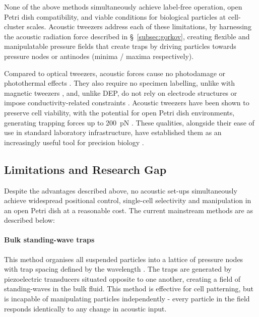 \documentclass[11pt,a4paper]{article}
\begin{document}
\noindent None of the above methods simultaneously achieve label-free operation, open Petri dish compatibility, and viable conditions for biological particles at cell-cluster scales. Acoustic tweezers address each of these limitations, by harnessing the acoustic radiation force described in \S~\ref{subsec:gorkov}, creating flexible and manipulatable pressure fields that create traps by driving particles towards pressure nodes or antinodes (minima / maxima respectively). 



Compared to optical tweezers, acoustic forces cause no photodamage or photothermal effects \cite{blazquez2019optical, neuman2008single, yang2025acoustic}. They also require no specimen labelling,  unlike with magnetic tweezers \cite{yang2025acoustic, neuman2008single}, and, unlike DEP, do not rely on electrode structures or impose conductivity-related constraints \cite{kim2019dielectrophoresis, yang2025acoustic}. Acoustic tweezers have been shown to preserve cell viability, with the potential for open Petri dish environments, generating trapping forces up to 200~$\mathrm{pN}$ \cite{baudoin2020acoustical}. These qualities, alongside their ease of use in standard laboratory infrastructure, have established them as an increasingly useful tool for precision biology \cite{yang2025acoustic, neuman2008single}. 


\subsection{Limitations and Research Gap}

Despite the advantages described above, no acoustic set-ups simultaneously achieve widespread positional control, single-cell selectivity and manipulation in an open Petri dish at a reasonable cost. The current mainstream methods are as described below:

\paragraph{Bulk standing-wave traps}
This method organises all suspended particles into a lattice of pressure nodes with trap spacing defined by the wavelength \cite{marzo2019holographic}. The traps are generated by piezoelectric transducers situated opposite to one another, creating a field of standing-waves in the bulk fluid. This method is effective for cell patterning, but is incapable of manipulating particles independently - every particle in the field responds identically to any change in acoustic input. 
\end{document}
